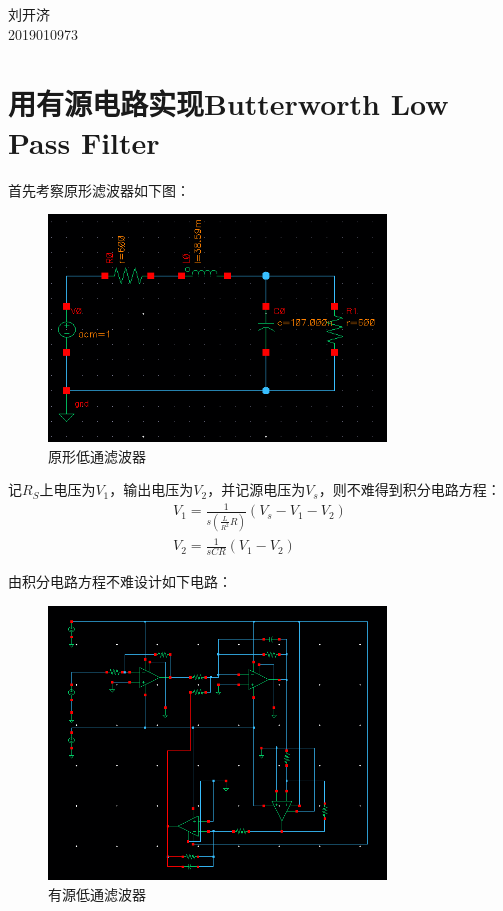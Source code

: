 \documentclass[12pt, a4paper]{article}
\begin{document}
	\begin{center}
		\vspace{0.2in}
		 \\ [12pt]
		  \\ [12pt]
		{\fontsize{14pt}{1.2em}\selectfont
			刘开济\\ [10pt]
			2019010973 \\ [10pt]
		}
	\end{center}
    \section{用有源电路实现Butterworth Low Pass Filter}
    首先考察原形滤波器如下图：
        \begin{figure}[H]
    	\centering
    	\includegraphics[width = 0.8\textwidth]{OriginalLPF}
    	\caption{原形低通滤波器}
    	\label{Fig2.1}
    \end{figure}\par
    记$R_S$上电压为$V_1$，输出电压为$V_2$，并记源电压为$V_s$，则不难得到积分电路方程：
    \begin{gather}
    	V_1  = \frac{1}{s (\frac{L}{R^2}R)}(V_s - V_1 - V_2)\\
    	V_2 = \frac{1}{sCR}(V_1 - V_2)
    \end{gather}\par
    由积分电路方程不难设计如下电路：
     \begin{figure}[H]
    	\centering
    	\includegraphics[width = 0.8\textwidth]{ActiveLPF}
    	\caption{有源低通滤波器}
    \end{figure}\par
\end{document}
